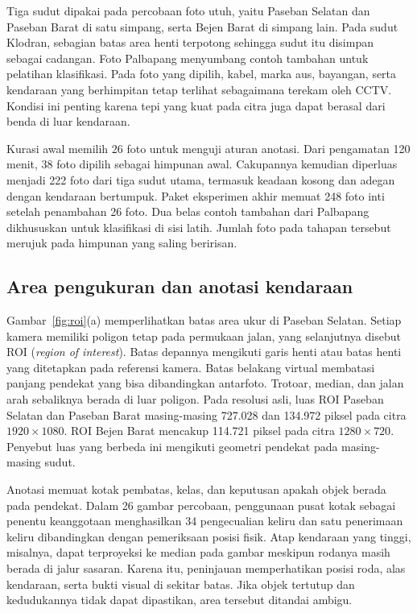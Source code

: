 \documentclass[conference,a4paper]{IEEEtran}
\begin{document}
Tiga sudut dipakai pada percobaan foto utuh, yaitu Paseban Selatan dan Paseban Barat di satu simpang, serta Bejen Barat di simpang lain. Pada sudut Klodran, sebagian batas area henti terpotong sehingga sudut itu disimpan sebagai cadangan. Foto Palbapang menyumbang contoh tambahan untuk pelatihan klasifikasi. Pada foto yang dipilih, kabel, marka aus, bayangan, serta kendaraan yang berhimpitan tetap terlihat sebagaimana terekam oleh CCTV. Kondisi ini penting karena tepi yang kuat pada citra juga dapat berasal dari benda di luar kendaraan.

Kurasi awal memilih 26 foto untuk menguji aturan anotasi. Dari pengamatan 120 menit, 38 foto dipilih sebagai himpunan awal. Cakupannya kemudian diperluas menjadi 222 foto dari tiga sudut utama, termasuk keadaan kosong dan adegan dengan kendaraan bertumpuk. Paket eksperimen akhir memuat 248 foto inti setelah penambahan 26 foto. Dua belas contoh tambahan dari Palbapang dikhususkan untuk klasifikasi di sisi latih. Jumlah foto pada tahapan tersebut merujuk pada himpunan yang saling beririsan.

\subsection{Area pengukuran dan anotasi kendaraan}
Gambar~\ref{fig:roi}(a) memperlihatkan batas area ukur di Paseban Selatan. Setiap kamera memiliki poligon tetap pada permukaan jalan, yang selanjutnya disebut ROI (\textit{region of interest}). Batas depannya mengikuti garis henti atau batas henti yang ditetapkan pada referensi kamera. Batas belakang virtual membatasi panjang pendekat yang bisa dibandingkan antarfoto. Trotoar, median, dan jalan arah sebaliknya berada di luar poligon. Pada resolusi asli, luas ROI Paseban Selatan dan Paseban Barat masing-masing 727.028 dan 134.972 piksel pada citra $1920\times1080$. ROI Bejen Barat mencakup 114.721 piksel pada citra $1280\times720$. Penyebut luas yang berbeda ini mengikuti geometri pendekat pada masing-masing sudut.

Anotasi memuat kotak pembatas, kelas, dan keputusan apakah objek berada pada pendekat. Dalam 26 gambar percobaan, penggunaan pusat kotak sebagai penentu keanggotaan menghasilkan 34 pengecualian keliru dan satu penerimaan keliru dibandingkan dengan pemeriksaan posisi fisik. Atap kendaraan yang tinggi, misalnya, dapat terproyeksi ke median pada gambar meskipun rodanya masih berada di jalur sasaran. Karena itu, peninjauan memperhatikan posisi roda, alas kendaraan, serta bukti visual di sekitar batas. Jika objek tertutup dan kedudukannya tidak dapat dipastikan, area tersebut ditandai ambigu.
\end{document}

